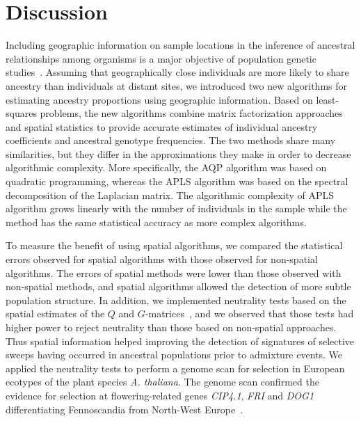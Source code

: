 \clearpage
\newpage



\section{Discussion}
Including geographic information on sample locations in the inference of ancestral relationships among  organisms is a major objective of population genetic studies~\citep{Malecot1948, Cavalli-Sforza1994, Epperson2003}. Assuming that geographically close individuals are more likely to share ancestry than individuals at distant sites, we introduced two new  algorithms for estimating ancestry proportions using geographic information. Based on least-squares problems, the new algorithms combine matrix factorization approaches and spatial statistics to provide accurate estimates of individual ancestry coefficients and ancestral genotype frequencies. The two methods share many similarities, but they differ in the approximations they make in order to decrease algorithmic complexity.  More specifically, the AQP algorithm was based on quadratic programming, whereas the APLS algorithm was based on the spectral decomposition of the Laplacian matrix. The algorithmic complexity of APLS algorithm grows linearly with the number of individuals in the sample while the method has the same statistical accuracy as more complex algorithms. 


To measure the benefit of using spatial algorithms, we compared the statistical errors observed for spatial algorithms with those observed for non-spatial algorithms. The errors of spatial methods were lower than those observed  with non-spatial methods, and spatial algorithms allowed the detection of more subtle population structure. In addition, we implemented neutrality tests based on the spatial estimates of the $Q$ and $G$-matrices~\citep{Martins2016}, and we observed that those tests had higher power to reject neutrality than those based on non-spatial approaches. Thus spatial information helped improving the detection of signatures of selective sweeps having occurred  in ancestral populations prior to admixture events. We applied the neutrality tests to perform a genome scan for selection in European ecotypes of the plant species {\it A. thaliana}. The genome scan confirmed the evidence for selection at flowering-related genes {\it CIP4.1}, {\it FRI} and {\it DOG1} differentiating Fennoscandia from North-West Europe~\citep{Horton2012}.

